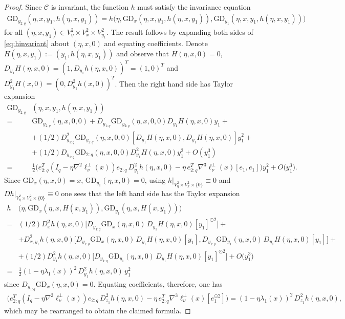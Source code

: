 \documentclass{article}
\newcommand{\CC}{\mathcal{C}}
\newcommand{\GD}{\mathrm{GD}}
\theoremstyle{plain}
\theoremstyle{definition}
\theoremstyle{remark}
\begin{document}
\begin{proof}
    Since $\CC$ is invariant, the function $h$ must satisfy the invariance equation
    \begin{align}\label{eq:hinvariant}
    \GD_{y_{2:q}}(\eta,x,y_1,h(\eta,x,y_1)) = h\big(\eta,\GD_x(\eta,x,y_1,h(\eta,x,y_1)),\GD_{y_1}(\eta,x,y_1,h(\eta,x,y_1))\big)
    \end{align}
    for all $(\eta,x,y_1)\in V^2_{\eta}\times V^2_x\times V^2_{y_1}$. The result follows by expanding both sides of \eqref{eq:hinvariant} about $(\eta,x,0)$ and equating coefficients. Denote $H(\eta,x,y_1):=(y_1,h(\eta,x,y_1))$ and observe that $H(\eta,x,0) = 0$, $D_{y_1}H(\eta,x,0) = (1,D_{y_1}h(\eta,x,0))^T = (1,0)^T$ and $D_{y_1}^2H(x,0) = (0,D^2_{y_1}h(x,0))^T$. Then the right hand side has Taylor expansion
    \begin{align}
        \GD_{y_{2:q}}&(\eta,x,y_1,h(\eta,x,y_1))\\=&\GD_{y_{2:q}}(\eta,x,0,0) + D_{y_{1:q}}\GD_{y_{2:q}}(\eta,x,0,0)D_{y_1}H(\eta,x,0)y_1 +\\&+(1/2)D^2_{y_{1:q}}\GD_{y_{2:q}}(\eta,x,0,0)[D_{y_1}H(\eta,x,0),D_{y_1}H(\eta,x,0)] y_1^2+\\& + (1/2)D_{y_{1:q}}\GD_{2:q}(\eta,x,0,0)D^2_{y_1}H(\eta,x,0) y_1^2 + O( y_1^3)\\=&\frac{1}{2}\big(e_{2:q}^T(I_q-\eta\nabla^2\ell_{\nu}^{\perp}(x))e_{2:q}\,D^2_{y_1}h(\eta,x,0) - \eta\,e_{2:q}^T\nabla^3\ell_{\nu}^{\perp}(x)[e_1,e_1]\big) y_1^2 + O\big( y_1^3\big).
    \end{align}
    Since $\GD_x(\eta,x,0) = x$, $\GD_{y_1}(\eta,x,0) = 0$, using $h|_{V^2_{\eta}\times V^2_x\times\{0\}}\equiv 0$ and $Dh|_{V^2_{\eta}\times V^2_x\times\{0\}}\equiv 0$ one sees that the left hand side has the Taylor expansion
    \begin{align}
        h&\big(\eta,\GD_x(\eta,x,H(x,y_1)),\GD_{y_1}(\eta,x,H(x,y_1))\big)\\=&(1/2)D^2_xh(\eta,x,0)\big[D_{y_{1:q}}\GD_x(\eta,x,0)\,D_{y_1}H(\eta,x,0)[y_1]^{\odot 2}\big]+\\&+D^2_{x,y_1}h(\eta,x,0)\big[D_{y_{1:q}}\GD_x(\eta,x,0)\,D_{y_1}H(\eta,x,0)[y_1],D_{y_{1:q}}\GD_{y_1}(\eta,x,0)\,D_{y_1}H(\eta,x,0)[y_1]\big]+\\&+(1/2)D^2_{y_1}h(\eta,x,0)\big[D_{y_{1:q}}\GD_{y_1}(\eta,x,0)\,D_{y_1}H(\eta,x,0)[y_1]^{\odot 2}\big] + O\big( y_1^3\big)\\=&\frac{1}{2}(1-\eta\lambda_1(x))^2\,D^2_{y_1}h(\eta,x,0)\, y_1^2
    \end{align}
    since $D_{y_{1:q}}\GD_x(\eta,x,0) = 0$. Equating coefficients, therefore, one has
    \begin{align}
    \bigg(e_{2:q}^T(I_q-\eta\nabla^2\ell_{\nu}^{\perp}(x))e_{2:q}\,D^2_{z_1}h(\eta,x,0) - \eta\,e_{2:q}^T\nabla^3\ell_{\nu}^{\perp}(x)[e_1^{\odot 2}]\bigg) = (1-\eta\lambda_1(x))^2\,D^2_{z_1}h(\eta,x,0),
    \end{align}
    which may be rearranged to obtain the claimed formula.
\end{proof}
\end{document}
